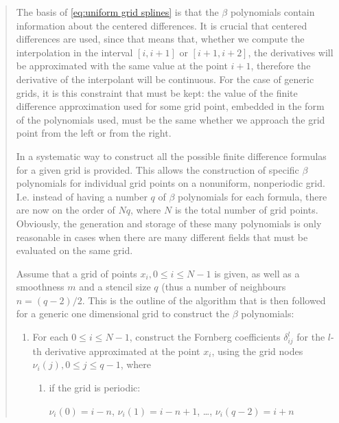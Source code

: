 \documentclass[11pt]{article}
\begin{document}
\begin{quotation}
        The basis of \eqref{eq:uniform grid splines} is that the $\beta$ polynomials contain information about
        the centered differences.
        It is crucial that centered differences are used, since that means that, whether we compute the
        interpolation in the interval $[i, i+1]$ or $[i+1, i+2]$, the derivatives will be approximated with the
        same value at the point $i+1$, therefore the derivative of the interpolant will be continuous.
        For the case of generic grids, it is this constraint that must be kept: the value of the finite
        difference approximation used for some grid point, embedded in the form of the polynomials used, must
        be the same whether we approach the grid point from the left or from the right.

        In \cite{fornberg_generation_1988, fornberg_classroom_1998} a systematic way to construct all the
        possible finite difference formulas for a given grid is provided.
        This allows the construction of specific $\beta$ polynomials for individual grid points on a nonuniform,
        nonperiodic grid.
        I.e. instead of having a number $q$ of $\beta$ polynomials for each formula, there are now on the
        order of $Nq$, where $N$ is the total number of grid points.
        Obviously, the generation and storage of these many polynomials is only reasonable in cases when there
        are many different fields that must be evaluated on the same grid.

        Assume that a grid of points $x_i, 0 \leq i \leq N - 1$ is given, as well as a smoothness $m$ and a
        stencil size $q$ (thus a number of neighbours $n = (q-2)/2$.
        This is the outline of the algorithm that is then followed for a generic one dimensional grid to
        construct the $\beta$ polynomials:

        \begin{enumerate}
            \item
                For each $0 \leq i \leq N - 1$, construct the Fornberg coefficients $\delta_{ij}^l$ for the
                $l$-th derivative approximated at the point $x_i$, using the grid nodes $\nu_i(j), 0 \leq j \leq
                q - 1$, where

                \begin{enumerate}
                    \item
                        if the grid is periodic:

                        $\nu_i(0) = i - n$, $\nu_i(1) = i - n + 1$, \ldots, $\nu_i(q - 2) = i + n$


\end{enumerate}
\end{enumerate}
\end{quotation}
\end{document}
